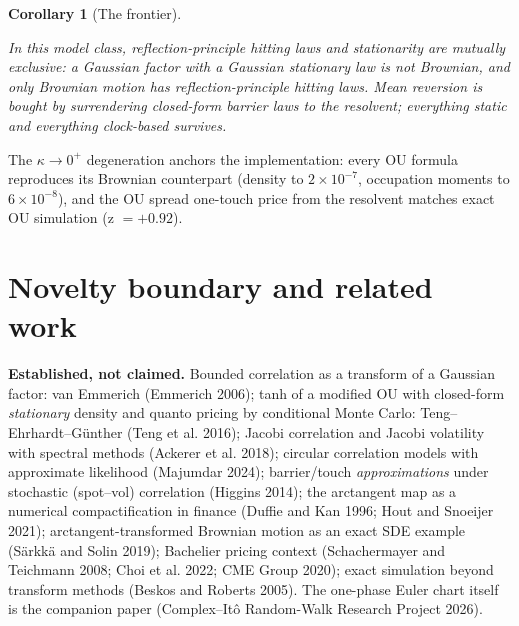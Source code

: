 \documentclass[
  english,
  10pt,
  letterpaper,
  DIV=11,
  numbers=noendperiod]{scrartcl}
\theoremstyle{plain}
\theoremstyle{plain}
\theoremstyle{plain}
\theoremstyle{plain}
\newtheorem{corollary}{Corollary}[section]
\theoremstyle{definition}
\theoremstyle{remark}
\begin{document}
\begin{corollary}[The
frontier]\protect\hypertarget{cor-frontier}{}\label{cor-frontier}

In this model class, reflection-principle hitting laws and stationarity
are mutually exclusive: a Gaussian factor with a Gaussian stationary law
is not Brownian, and only Brownian motion has reflection-principle
hitting laws. Mean reversion is bought by surrendering closed-form
barrier laws to the resolvent; everything static and everything
clock-based survives.

\end{corollary}

The \(\kappa\to0^{+}\) degeneration anchors the implementation: every OU
formula reproduces its Brownian counterpart (density to
\(2\times10^{-7}\), occupation moments to \(6\times10^{-8}\)), and the
OU spread one-touch price from the resolvent matches exact OU simulation
(z \(=+0.92\)).

\section{Novelty boundary and related work}\label{sec-related}

\textbf{Established, not claimed.} Bounded correlation as a transform of
a Gaussian factor: van Emmerich (Emmerich 2006); tanh of a modified OU
with closed-form \emph{stationary} density and quanto pricing by
conditional Monte Carlo: Teng--Ehrhardt--Günther (Teng et al. 2016);
Jacobi correlation and Jacobi volatility with spectral methods (Ackerer
et al. 2018); circular correlation models with approximate likelihood
(Majumdar 2024); barrier/touch \emph{approximations} under stochastic
(spot--vol) correlation (Higgins 2014); the arctangent map as a
numerical compactification in finance (Duffie and Kan 1996; Hout and
Snoeijer 2021); arctangent-transformed Brownian motion as an exact SDE
example (Särkkä and Solin 2019); Bachelier pricing context
(Schachermayer and Teichmann 2008; Choi et al. 2022; CME Group 2020);
exact simulation beyond transform methods (Beskos and Roberts 2005). The
one-phase Euler chart itself is the companion paper (Complex--Itô
Random-Walk Research Project 2026).
\end{document}
